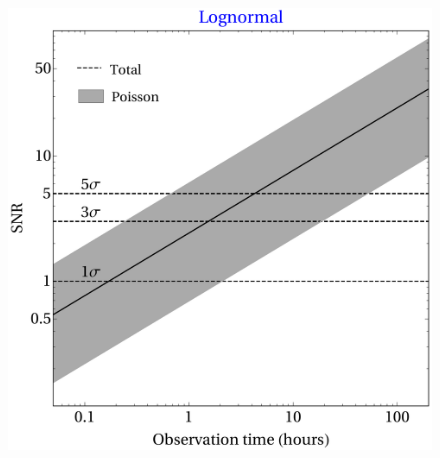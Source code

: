 \documentclass[xcolor={svgnames},compress]{beamer}
\begin{document}
\begin{frame}
\begin{columns}
\begin{column}{0.52\textwidth}
\begin{figure}[htbp!]
                \centering
                \includegraphics[width = \textwidth]{./pic/snr-log.pdf}
            \end{figure}
        \end{column}
    \end{columns}
\end{frame}
\end{document}
